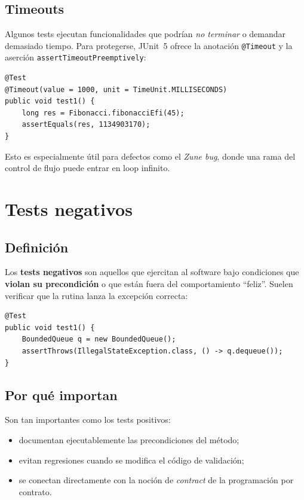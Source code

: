 \documentclass[12pt,a4paper]{article}
\begin{document}
\subsection{Timeouts}
Algunos tests ejecutan funcionalidades que podrían \textit{no terminar} o demandar demasiado tiempo. Para protegerse, JUnit~5 ofrece la anotación \texttt{@Timeout} y la aserción \texttt{assertTimeoutPreemptively}:
\begin{lstlisting}[style=javastyle]
@Test
@Timeout(value = 1000, unit = TimeUnit.MILLISECONDS)
public void test1() {
    long res = Fibonacci.fibonacciEfi(45);
    assertEquals(res, 1134903170);
}
\end{lstlisting}
Esto es especialmente útil para defectos como el \textit{Zune bug}, donde una rama del control de flujo puede entrar en loop infinito.

\section{Tests negativos}

\subsection{Definición}
Los \textbf{tests negativos} son aquellos que ejercitan al software bajo condiciones que \textbf{violan su precondición} o que están fuera del comportamiento ``feliz''. Suelen verificar que la rutina lanza la excepción correcta:
\begin{lstlisting}[style=javastyle]
@Test
public void test1() {
    BoundedQueue q = new BoundedQueue();
    assertThrows(IllegalStateException.class, () -> q.dequeue());
}
\end{lstlisting}

\subsection{Por qué importan}
Son tan importantes como los tests positivos:
\begin{itemize}
  \item documentan ejecutablemente las precondiciones del método;
  \item evitan regresiones cuando se modifica el código de validación;
  \item se conectan directamente con la noción de \textit{contract} de la programación por contrato.
\end{itemize}
\end{document}

